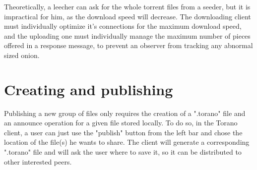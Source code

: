 Theoretically, a leecher can ask for the whole torrent files from a seeder, but it is impractical for him, as the download speed will decrease. The downloading client must individually optimize it's connections for the maximum download speed, and the uploading one must individually manage the maximum number of pieces offered in a response message, to prevent an observer from tracking any abnormal sized onion.  


\section{Creating and publishing}
Publishing a new group of files only requires the creation of a ".torano" file and an announce operation for a given file stored locally. To do so, in the Torano client, a user can just use the "publish" button from the left bar and chose the location of the file(s) he wants to share. The client will generate a corresponding ".torano" file and will ask the user where to save it, so it can be distributed to other interested peers.
